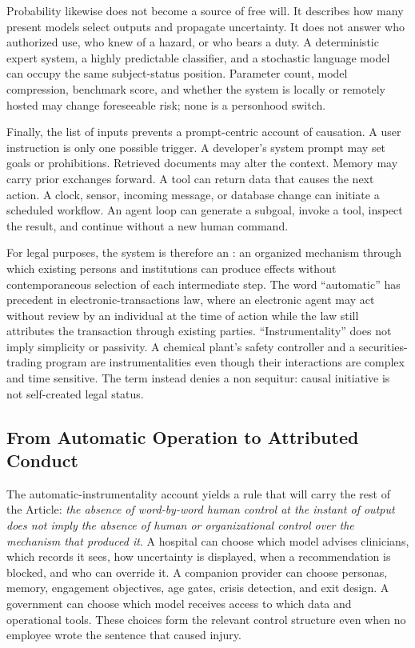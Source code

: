 Probability likewise does not become a source of free will. It describes how many present models select outputs and propagate uncertainty. It does not answer who authorized use, who knew of a hazard, or who bears a duty. A deterministic expert system, a highly predictable classifier, and a stochastic language model can occupy the same subject-status position. Parameter count, model compression, benchmark score, and whether the system is locally or remotely hosted may change foreseeable risk; none is a personhood switch.

Finally, the list of inputs prevents a prompt-centric account of causation. A user instruction is only one possible trigger. A developer's system prompt may set goals or prohibitions. Retrieved documents may alter the context. Memory may carry prior exchanges forward. A tool can return data that causes the next action. A clock, sensor, incoming message, or database change can initiate a scheduled workflow. An agent loop can generate a subgoal, invoke a tool, inspect the result, and continue without a new human command.

For legal purposes, the system is therefore an : an organized mechanism through which existing persons and institutions can produce effects without contemporaneous selection of each intermediate step. The word ``automatic'' has precedent in electronic-transactions law, where an electronic agent may act without review by an individual at the time of action while the law still attributes the transaction through existing parties. ``Instrumentality'' does not imply simplicity or passivity. A chemical plant's safety controller and a securities-trading program are instrumentalities even though their interactions are complex and time sensitive. The term instead denies a non sequitur: causal initiative is not self-created legal status.

\subsection{From Automatic Operation to Attributed Conduct}

The automatic-instrumentality account yields a rule that will carry the rest of the Article: \emph{the absence of word-by-word human control at the instant of output does not imply the absence of human or organizational control over the mechanism that produced it}. A hospital can choose which model advises clinicians, which records it sees, how uncertainty is displayed, when a recommendation is blocked, and who can override it. A companion provider can choose personas, memory, engagement objectives, age gates, crisis detection, and exit design. A government can choose which model receives access to which data and operational tools. These choices form the relevant control structure even when no employee wrote the sentence that caused injury.


